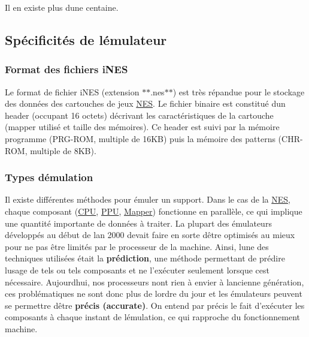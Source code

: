 Il en existe plus d\textquotesingle{}une centaine.

\subsection*{Spécificités de l\textquotesingle{}émulateur}

\subsubsection*{Format des fichiers i\+N\+ES}

Le format de fichier i\+N\+ES (extension $\ast$$\ast$.nes$\ast$$\ast$) est très répandue pour le stockage des données des cartouches de jeux \hyperlink{struct_n_e_s}{N\+ES}. Le fichier binaire est constitué d\textquotesingle{}un header (occupant 16 octets) décrivant les caractéristiques de la cartouche (mapper utilisé et taille des mémoires). Ce header est suivi par la mémoire programme (P\+R\+G-\/\+R\+OM, multiple de 16\+KB) puis la mémoire des patterns (C\+H\+R-\/\+R\+OM, multiple de 8\+KB).

\subsubsection*{Types d\textquotesingle{}émulation}

Il existe différentes méthodes pour émuler un support. Dans le cas de la \hyperlink{struct_n_e_s}{N\+ES}, chaque composant (\hyperlink{struct_c_p_u}{C\+PU}, \hyperlink{struct_p_p_u}{P\+PU}, \hyperlink{struct_mapper}{Mapper}) fonctionne en parallèle, ce qui implique une quantité importante de données à traiter. La plupart des émulateurs développés au début de l\textquotesingle{}an 2000 devait faire en sorte d\textquotesingle{}être optimisés au mieux pour ne pas être limités par le processeur de la machine. Ainsi, l\textquotesingle{}une des techniques utilisées était la {\bfseries prédiction}, une méthode permettant de prédire l\textquotesingle{}usage de tels ou tels composants et ne l’exécuter seulement lorsque c\textquotesingle{}est nécessaire. Aujourd\textquotesingle{}hui, nos processeurs n\textquotesingle{}ont rien à envier à l\textquotesingle{}ancienne génération, ces problématiques ne sont donc plus de l\textquotesingle{}ordre du jour et les émulateurs peuvent se permettre d\textquotesingle{}être {\bfseries précis (accurate)}. On entend par précis le fait d’exécuter les composants à chaque instant de l\textquotesingle{}émulation, ce qui rapproche du fonctionnement machine.

